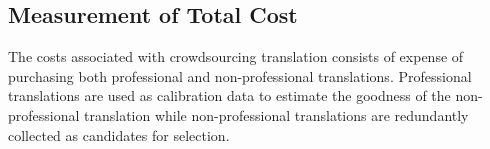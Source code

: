 \documentclass[11pt,letterpaper]{article}
\begin{document}
\subsection{Measurement of Total Cost}

The costs associated with crowdsourcing translation consists of expense of purchasing both professional and non-professional translations.  
Professional translations are used as calibration data to estimate the goodness of the non-professional translation while non-professional translations are redundantly collected  as candidates for selection. 
\end{document}
